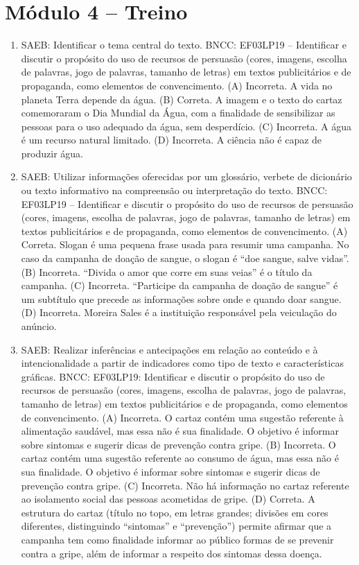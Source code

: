 \section*{Módulo 4 – Treino}

\begin{enumerate}
\item
SAEB: Identificar o tema central do texto.
BNCC: EF03LP19 -- Identificar e discutir o propósito do uso de recursos de
persuasão (cores, imagens, escolha de palavras, jogo de palavras,
tamanho de letras) em textos publicitários e de propaganda, como
elementos de convencimento.
(A) Incorreta. A vida no planeta Terra depende da água. 
(B) Correta. A imagem e o texto do cartaz  comemoraram o Dia Mundial da Água, com a finalidade de sensibilizar as pessoas para o uso adequado da água, sem desperdício.   
(C) Incorreta. A água é um recurso natural limitado.  
(D) Incorreta. A ciência não é capaz de produzir água. 

\item
SAEB: Utilizar informações oferecidas por um glossário, verbete de
dicionário ou texto informativo na compreensão ou interpretação do
texto.
BNCC: EF03LP19 -- Identificar e discutir o propósito do uso de recursos de
persuasão (cores, imagens, escolha de palavras, jogo de palavras,
tamanho de letras) em textos publicitários e de propaganda, como
elementos de convencimento.
(A) Correta. Slogan é uma pequena frase usada para resumir uma campanha.
No caso da campanha de doação de sangue, o slogan é ``doe sangue, salve
vidas''.
(B) Incorreta. ``Divida o amor que corre em suas veias'' é o título da
campanha.
(C) Incorreta. ``Participe da campanha de doação de sangue'' é um subtítulo
que precede as informações sobre onde e quando doar sangue.
(D) Incorreta. Moreira Sales é a instituição responsável pela veiculação
do anúncio.

\item
SAEB: Realizar inferências e antecipações em relação ao conteúdo
e à intencionalidade a partir de indicadores como tipo de texto e
características gráficas.
BNCC: EF03LP19: Identificar e discutir o propósito do uso de recursos de
persuasão (cores, imagens, escolha de palavras, jogo de palavras,
tamanho de letras) em textos publicitários e de propaganda, como
elementos de convencimento.
(A) Incorreta. O cartaz contém uma sugestão referente à alimentação 
saudável, mas essa não é sua finalidade. O objetivo é informar sobre 
sintomas e sugerir dicas de prevenção contra gripe.  
(B) Incorreta. O cartaz contém uma sugestão referente ao consumo de água,
mas essa não é sua finalidade. O objetivo é informar sobre sintomas e 
sugerir dicas de prevenção contra gripe.
(C) Incorreta. Não há informação no cartaz referente ao isolamento social 
das pessoas acometidas de gripe. 
(D) Correta. A estrutura do cartaz (título no topo, em letras grandes; 
divisões em cores diferentes, distinguindo ``sintomas'' e ``prevenção'') 
permite afirmar que a campanha tem como finalidade informar ao público 
formas de se prevenir contra a gripe, além de informar a respeito dos
sintomas dessa doença.
\end{enumerate}

